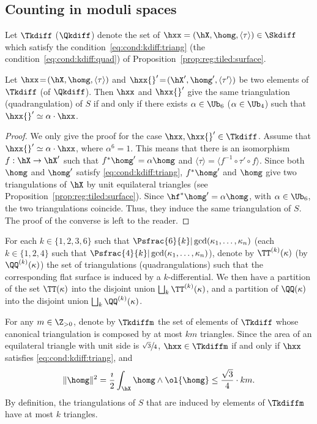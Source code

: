 \subsection{Counting in moduli spaces}\label{sec:count:in:mod:sp}
Let $\Tkdiff$ (\resp $\Qkdiff$) denote the set of $\hxx=(\hX,\homg,\langle\tau\rangle)\in \Skdiff$ which satisfy the condition~\eqref{eq:cond:kdiff:triang} (\resp the condition~\eqref{eq:cond:kdiff:quad}) of Proposition~\ref{prop:reg:tiled:surface}.

\begin{Lemma}\label{lm:forms:same:triang}
Let $\hxx\!=\!(\hX,\homg,\langle \tau \rangle)$ and $\hxx{}'\!=\!(\hX',\homg',\langle \tau' \rangle)$ be two elements of $\Tkdiff$ (\resp of $\Qkdiff$).
Then $\hxx$ and $\hxx{}'$ give the same triangulation (\resp quadran\-gulation) of $S$ if and only if there exists $\alpha\in \Ub_6$ (\resp $\alpha\in \Ub_{4}$) such that $\hxx{}'\simeq\alpha\cdot\hxx$.
\end{Lemma}
\begin{proof}
We only give the proof for the case $\hxx,\hxx{}'\in\Tkdiff$.
Assume that $\hxx{}' \simeq\alpha\cdot\hxx$, where $\alpha^{6}=1$.
This means that there is an isomorphism $f: \hX \to \hX'$ such that $f^*\homg'=\alpha\homg$ and $\langle \tau\rangle=\langle f^{-1}\circ\tau'\circ f \rangle$. Since both $\homg$ and $\homg'$ satisfy \eqref{eq:cond:kdiff:triang}, $f^*\homg'$ and $\homg$ give two triangulations of $\hX$ by unit equilateral triangles (see Proposition~\ref{prop:reg:tiled:surface}). Since $\hf^*\homg'=\alpha\homg$, with $\alpha\in \Ub_6$, the two triangulations coincide. Thus, they induce the same triangulation of $S$. The proof of the converse is left to the reader.
\end{proof}

For each $k \in \{1,2,3,6\}$ such that $\Psfrac{6}{k} | \gcd(\kappa_1,\dots,\kappa_n)$ (\resp each $k\in \{1,2,4\}$ such that $\Psfrac{4}{k} | \gcd(\kappa_1,\dots,\kappa_n)$), denote by $\TT^{(k)}(\kappa)$ (\resp by $\QQ^{(k)}(\kappa)$) the set of triangulations (\resp quadrangulations) such that the corresponding flat surface is induced by a $k$-differential. We then have a partition of the set $\TT(\kappa)$ into the disjoint union $\bigsqcup_{k}\TT^{(k)}(\kappa)$, and a partition of $\QQ(\kappa)$ into the disjoint union $\bigsqcup_{k}\QQ^{(k)}(\kappa)$.

For any $m\in \Z_{>0}$, denote by $\Tkdiffm$ the set of elements of $\Tkdiff$ whose canonical triangulation is composed by at most $km$ triangles.
Since the area of an equilateral triangle with unit side is $\sfrac{\sqrt{3}}{4}$, $\hxx \in \Tkdiffm$ if and only if $\hxx$ satisfies \eqref{eq:cond:kdiff:triang}, and
\[
\|\homg\|^2=\frac{\imath}{2}\int_{\hX}\homg\wedge\ol{\homg} \leq \frac{\sqrt{3}}{4}\cdot km.
\]
By definition, the triangulations of $S$ that are induced by elements of $\Tkdiffm$ have at most $k$ triangles.

